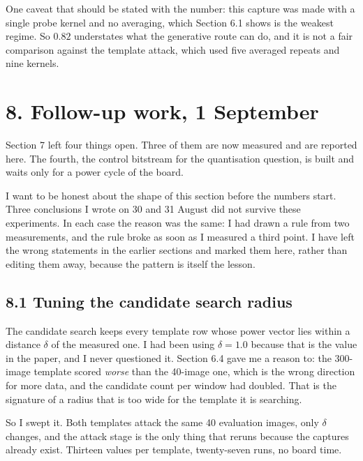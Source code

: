 \documentclass[11pt,a4paper]{article}
\begin{document}
\begin{table}[h]
  \centering
  \small
  \resizebox{\textwidth}{!}{}
  \caption{Generative reconstruction. The first row is the earlier result and is void:
  it was measured on a capture with no authenticity gate and a different bitstream.}
  \label{tab:p2p}
\end{table}

One caveat that should be stated with the number: this capture was made with a single
probe kernel and no averaging, which Section 6.1 shows is the weakest regime. So $0.82$
understates what the generative route can do, and it is not a fair comparison against
the template attack, which used five averaged repeats and nine kernels.


\section*{8. Follow-up work, 1 September}

Section 7 left four things open. Three of them are now measured and are reported here.
The fourth, the control bitstream for the quantisation question, is built and waits only
for a power cycle of the board.

I want to be honest about the shape of this section before the numbers start. Three
conclusions I wrote on 30 and 31 August did not survive these experiments. In each case
the reason was the same: I had drawn a rule from two measurements, and the rule broke as
soon as I measured a third point. I have left the wrong statements in the earlier
sections and marked them here, rather than editing them away, because the pattern is
itself the lesson.

\subsection*{8.1 Tuning the candidate search radius}

The candidate search keeps every template row whose power vector lies within a distance
$\delta$ of the measured one. I had been using $\delta = 1.0$ because that is the value
in the paper, and I never questioned it. Section 6.4 gave me a reason to: the 300-image
template scored \emph{worse} than the 40-image one, which is the wrong direction for more
data, and the candidate count per window had doubled. That is the signature of a radius
that is too wide for the template it is searching.

So I swept it. Both templates attack the same 40 evaluation images, only $\delta$ changes,
and the attack stage is the only thing that reruns because the captures already exist.
Thirteen values per template, twenty-seven runs, no board time.
\end{document}
